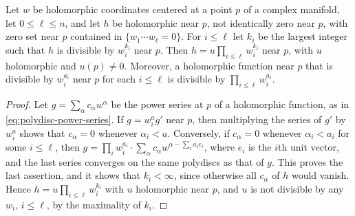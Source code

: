 \begin{lemma}\label{lem:normal-crossings-monomial}
Let $w$ be holomorphic coordinates centered at a point $p$ of a complex manifold, let $0\leq\ell\leq n$, and let $h$ be holomorphic near $p$, not identically zero near $p$, with zero set near $p$ contained in $\{w_1\cdots w_\ell=0\}$. For $i\leq\ell$ let $k_i$ be the largest integer such that $h$ is divisible by $w_i^{k_i}$ near $p$. Then $h=u\prod_{i\leq\ell}w_i^{k_i}$ near $p$, with $u$ holomorphic and $u(p)\neq0$. Moreover, a holomorphic function near $p$ that is divisible by $w_i^{a_i}$ near $p$ for each $i\leq\ell$ is divisible by $\prod_{i\leq\ell}w_i^{a_i}$.
\end{lemma}
\begin{proof}
Let $g=\sum_\alpha c_\alpha w^\alpha$ be the power series at $p$ of a holomorphic function, as in \eqref{eq:polydisc-power-series}. If $g=w_i^ag'$ near $p$, then multiplying the series of $g'$ by $w_i^a$ shows that $c_\alpha=0$ whenever $\alpha_i<a$. Conversely, if $c_\alpha=0$ whenever $\alpha_i<a_i$ for some $i\leq\ell$, then $g=\prod_iw_i^{a_i}\cdot\sum_\alpha c_\alpha w^{\alpha-\sum_ia_ie_i}$, where $e_i$ is the $i$th unit vector, and the last series converges on the same polydiscs as that of $g$. This proves the last assertion, and it shows that $k_i<\infty$, since otherwise all $c_\alpha$ of $h$ would vanish. Hence $h=u\prod_{i\leq\ell}w_i^{k_i}$ with $u$ holomorphic near $p$, and $u$ is not divisible by any $w_i$, $i\leq\ell$, by the maximality of $k_i$.


\end{proof}
